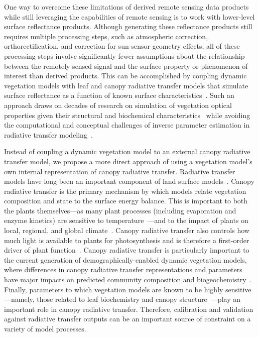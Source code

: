 One way to overcome these limitations of derived remote sensing data products while still leveraging the capabilities of remote sensing is to work with lower-level surface reflectance products.
Although generating these reflectance products still requires multiple processing steps, such as atmospheric correction, orthorectification, and correction for sun-sensor geometry effects, all of these processing steps involve significantly fewer assumptions about the relationship between the remotely sensed signal and the surface property or phenomenon of interest than derived products.
This can be accomplished by coupling dynamic vegetation models with leaf and canopy radiative transfer models that simulate surface reflectance as a function of known surface characteristics~\citep{knorr2001assimilation, nouvellon2001coupling, quaife2008assimilating}.
Such an approach draws on decades of research on simulation of vegetation optical properties given their structural and biochemical characteristics~\citep{dickinson1983land, sellers1985canopy, verhoef1984light, lewis2007spectral, jacquemoud2009prospect, pinty2004synergy, widlowski2007third, widlowski2015fourth, hogan_2018_fast} while avoiding the computational and conceptual challenges of inverse parameter estimation in radiative transfer modeling~\citep{combal2003retrieval, lewis2007spectral}.

Instead of coupling a dynamic vegetation model to an external canopy radiative transfer model, we propose a more direct approach of using a vegetation model's own internal representation of canopy radiative transfer.
Radiative transfer models have long been an important component of land surface models~\citep{dickinson1983land, sellers1985canopy}.
Canopy radiative transfer is the primary mechanism by which models relate vegetation composition and state to the surface energy balance.
This is important to both the plants themselves---as many plant processes (including evaporation and enzyme kinetics) are sensitive to temperature~\citep{serbin2012leaf}---and to the impact of plants on local, regional, and global climate~\citep{bonan2008forests}.
Canopy radiative transfer also controls how much light is available to plants for photosynthesis and is therefore a first-order driver of plant function~\citep{hikosaka1995model, robakowski_2004_growth, niinemets2016withincanopy, keenan2016global}.
Canopy radiative transfer is particularly important to the current generation of demographically-enabled dynamic vegetation models, where differences in canopy radiative transfer representations and parameters have major impacts on predicted community composition and biogeochemistry~\citep{loew_2014_do, fisher2018vegetation, viskari_2019_influence}.
Finally, parameters to which vegetation models are known to be highly sensitive---namely, those related to leaf biochemistry and canopy structure~\citep{dietze2014quantitative, raczka_2018_what, shiklomanov2020structurea}---play an important role in canopy radiative transfer.
Therefore, calibration and validation against radiative transfer outputs can be an important source of constraint on a variety of model processes.

